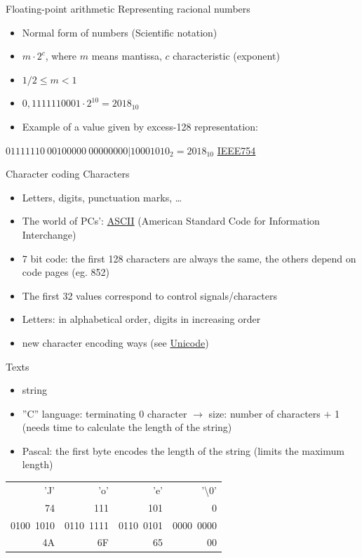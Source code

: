 \documentclass[usenames,dvipsnames,aspectratio=169]{beamer}
\newcommand{\hiv}[1]{{\color{hivatkozasszin}#1}}
\begin{document}
\begin{frame}{Floating-point arithmetic}
  Representing racional numbers
  \begin{itemize}
    \item Normal form of numbers (Scientific notation)
    \item $m\cdot2^c$, where $m$ means mantissa, $c$ characteristic (exponent)
    \item $1/2 \leq m < 1$
    \item $0,1111110001\cdot2^{10} = 2018_{10}$
    \item Example of a value given by excess-128 representation:
  \end{itemize}
  \vfill
  $01111110\ 00100000\ 00000000|10001010_2 = 2018_{10}$
  \vfill
  \hiv{\href{https://www.h-schmidt.net/FloatConverter/IEEE754.html}{IEEE754}}
\end{frame}

\begin{frame}{Character coding}
  Characters
  \begin{itemize}
    \item Letters, digits, punctuation marks, \dots
    \item The world of PCs': \hiv{\href{https://en.wikipedia.org/wiki/ASCII}{ASCII}}
(American Standard Code for Information Interchange)
    \item 7 bit code: the first 128 characters are always the same, the others depend on code pages (eg. 852)
    \item The first 32 values correspond to control signals/characters
    \item Letters: in alphabetical order, digits in increasing order
    \item new character encoding ways (see 
\hiv{\href{https://en.wikipedia.org/wiki/Unicode}{Unicode}})
  \end{itemize}
  Texts
  \begin{itemize}
    \item string
    \item ''C'' language: terminating $0$ character $\to$ size: number of characters $+$ 1 (needs time to calculate the length of the string)
    \item Pascal: the first byte encodes the length of the string (limits the maximum length)
  \end{itemize}
  \begin{center}
  \tiny{
  \begin{tabular}{r|r|r|r}
  'J' & 'o' & 'e' & '\textbackslash0'\\
  74 & 111 & 101 & 0\\
  0100\ 1010 & 0110\ 1111 & 0110\ 0101 & 0000\ 0000\\
  4A & 6F & 65 & 00
  \end{tabular}
  }
  \end{center}
\end{frame}
\end{document}
